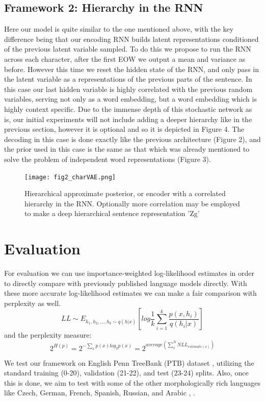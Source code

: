 \documentclass[journal, 12pt, draftcls, onecolumn]{IEEEtran}
\begin{document}
\subsection{Framework 2: Hierarchy in the RNN}
Here our model is quite similar to the one mentioned above, with the key difference being that our encoding RNN builds latent representations conditioned of the previous latent variable sampled. To do this we propose to run the RNN across each character, after the first EOW we output a mean and variance as before. However this time we reset the hidden state of the RNN, and only pass in the latent variable as a representations of the previous parts of the sentence. In this case our last hidden variable is highly correlated with the previous random variables, serving not only as a word embedding, but a word embedding which is highly context specific. Due to the immense depth of this stochastic network as is, our initial experiments will not include adding a deeper hierarchy like in the previous section, however it is optional and so it is depicted in Figure 4. The decoding in this case is done exactly like the previous architecture (Figure 2), and the prior used in this case is the same as that which was already mentioned to solve the problem of independent word representations (Figure 3).

\begin{figure}
\centering
\texttt{[image: fig2\_charVAE.png]}
\caption{Hierarchical approximate posterior, or encoder with a correlated hierarchy in the RNN. Optionally more correlation may be employed to make a deep hierarchical sentence representation 'Zg'}
\end{figure}


\section {Evaluation} \label{eval}
For evaluation we can use importance-weighted log-likelihood \cite{C17} estimates in order to directly compare with previously published language models directly. With these more accurate log-likelihood estimates we can make a fair comparison with perplexity as well.
\[LL \sim E_{h_1,h_2,...,h_k \sim q(h|x)}[log \dfrac{1}{k} \sum_{i=1}^k \dfrac{p(x,h_i)}{q(h_i|x)}]\]
and the perplexity measure:
\[2^{H(p)}= 2^{-\sum_x p(x) log_2 p(x)}=2^{average(\sum_x^N NLL_{estimate(x)})}\]

We test our framework on English Penn TreeBank (PTB) dataset \cite{C18}, utilizing the standard training (0-20), validation (21-22), and test (23-24) splits. Also, once this is done, we aim to test with some of the other morphologically rich languages like Czech, German, French, Spanish, Russian, and Arabic \cite{C19}, \cite{C20}. 
\end{document}
